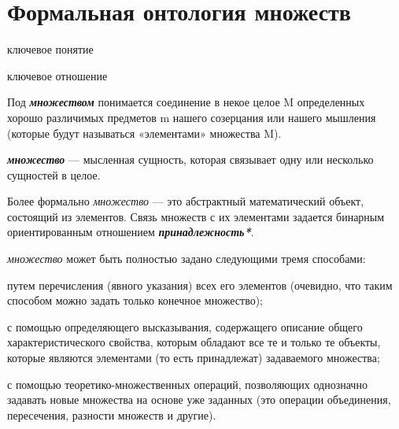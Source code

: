 \section{Формальная онтология множеств}
\label{sec_top_ontologies_set}

\begin{SCn}
\begin{scnrelfromlist}{ключевое понятие}
\end{scnrelfromlist}

\begin{scnrelfromlist}{ключевое отношение}
\end{scnrelfromlist}
\end{SCn}

Под \textbf{\textit{множеством}} понимается соединение в некое целое M определенных хорошо различимых предметов m нашего созерцания или нашего мышления (которые будут называться «элементами» множества M). 

\textbf{\textit{множество}} --- мысленная сущность, которая связывает одну или несколько сущностей в целое.

Более формально \textit{множество} --- это абстрактный математический объект, состоящий из элементов. Связь множеств с их элементами задается бинарным ориентированным отношением \textbf{\textit{принадлежность*}}.

\textit{множество} может быть полностью задано следующими тремя способами:

\begin{textitemize}
	\item путем перечисления (явного указания) всех его элементов (очевидно, что таким способом можно задать только конечное множество);
	\item с помощью определяющего высказывания, содержащего описание общего характеристического свойства, которым обладают все те и только те объекты, которые являются элементами (то есть принадлежат) задаваемого множества;
	\item с помощью теоретико-множественных операций, позволяющих однозначно задавать новые множества на основе уже заданных (это операции объединения, пересечения, разности множеств и другие).
\end{textitemize}

